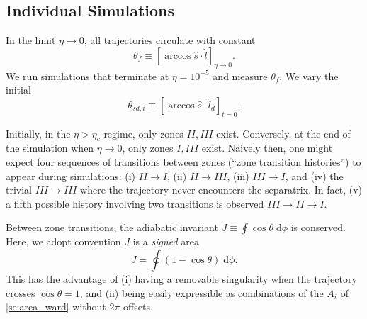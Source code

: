 \documentclass[
        fleqn,
        usenatbib,
    ]{mnras}
\newcommand*{\p}[1]{\left(#1\right)}
\newcommand*{\s}[1]{\left[#1\right]}
\begin{document}
\subsection{Individual Simulations}\label{ss:ad_fid}

In the limit $\eta \to 0$, all trajectories circulate with constant
\begin{equation}
    \theta_{f} \equiv \s{\arccos \hat{s} \cdot \hat{l}}_{\eta \to 0}.
\end{equation}
We run simulations that terminate at $\eta = 10^{-5}$ and measure
$\theta_{f}$. We vary the initial
\begin{equation}
    \theta_{sd, i} \equiv \s{\arccos \hat{s} \cdot \hat{l}_d}_{t=0}.
\end{equation}

Initially, in the $\eta > \eta_c$ regime, only zones $II, III$ exist.
Conversely, at the end of the simulation when $\eta \to 0$, only zones $I, III$
exist. Naively then, one might expect four sequences of transitions
between zones (``zone transition histories'') to appear during simulations: (i)
$II \to I$, (ii) $II \to III$, (iii) $III \to I$, and (iv) the trivial $III \to
III$ where the trajectory never encounters the separatrix. In fact, (v) a fifth
possible history involving two transitions is observed $III \to II \to I$.

Between zone transitions, the adiabatic invariant $J \equiv \oint \cos\theta
\;\mathrm{d}\phi$ is conserved. Here, we adopt convention $J$ is a \emph{signed}
area
\begin{equation}
    J = \oint \p{1 - \cos \theta}\;\mathrm{d}\phi.
\end{equation}
This has the advantage of (i) having a removable singularity when the trajectory
crosses $\cos \theta = 1$, and (ii) being easily expressible as combinations of
the $A_i$ of \autoref{se:area_ward} without $2\pi$ offsets.
\end{document}
